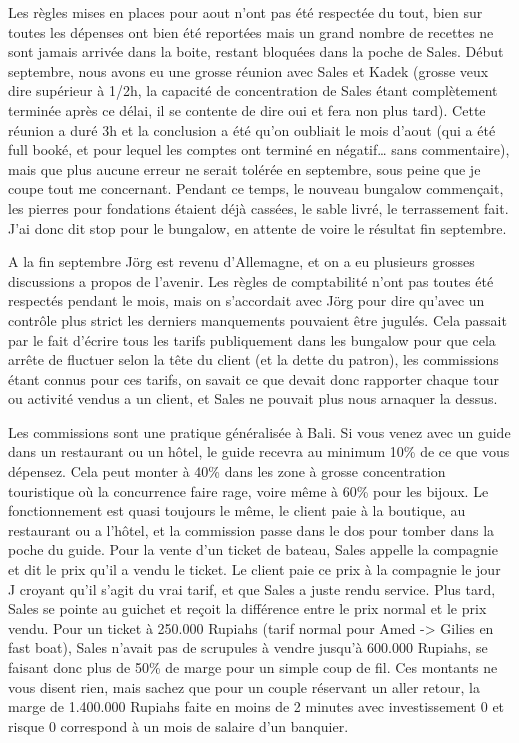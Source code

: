 Les règles mises en places pour aout n’ont pas été respectée du tout, bien sur toutes les dépenses ont bien été reportées mais un grand nombre de recettes ne sont jamais arrivée dans la boite, restant bloquées dans la poche de Sales. Début septembre, nous avons eu une grosse réunion avec Sales et Kadek (grosse veux dire supérieur à 1/2h, la capacité de concentration de Sales étant complètement terminée après ce délai, il se contente de dire oui et fera non plus tard). Cette réunion a duré 3h et la conclusion a été qu’on oubliait le mois d’aout (qui a été full booké, et pour lequel les comptes ont terminé en négatif… sans commentaire), mais que plus aucune erreur ne serait tolérée en septembre, sous peine que je coupe tout me concernant. Pendant ce temps, le nouveau bungalow commençait, les pierres pour fondations étaient déjà cassées, le sable livré, le terrassement fait. J’ai donc dit stop pour le bungalow, en attente de voire le résultat fin septembre.

A la fin septembre Jörg est revenu d’Allemagne, et on a eu plusieurs grosses discussions a propos de l’avenir. Les règles de comptabilité n’ont pas toutes été respectés pendant le mois, mais on s’accordait avec Jörg pour dire qu’avec un contrôle plus strict les derniers manquements pouvaient être jugulés. Cela passait par le fait d’écrire tous les tarifs publiquement dans les bungalow pour que cela arrête de fluctuer selon la tête du client (et la dette du patron), les commissions étant connus pour ces tarifs, on savait ce que devait donc rapporter chaque tour ou activité vendus a un client, et Sales ne pouvait plus nous arnaquer la dessus.

Les commissions sont une pratique généralisée à Bali. Si vous venez avec un guide dans un restaurant ou un hôtel, le guide recevra au minimum 10\% de ce que vous dépensez. Cela peut monter à 40\% dans les zone à grosse concentration touristique où la concurrence faire rage, voire même à 60\% pour les bijoux. Le fonctionnement est quasi toujours le même, le client paie à la boutique, au restaurant ou a l’hôtel, et la commission passe dans le dos pour tomber dans la poche du guide. Pour la vente d’un ticket de bateau, Sales appelle la compagnie et dit le prix qu’il a vendu le ticket. Le client paie ce prix à la compagnie le jour J croyant qu’il s’agit du vrai tarif, et que Sales a juste rendu service. Plus tard, Sales se pointe au guichet et reçoit la différence entre le prix normal et le prix vendu. Pour un ticket à 250.000 Rupiahs (tarif normal pour Amed -> Gilies en fast boat), Sales n’avait pas de scrupules à vendre jusqu’à 600.000 Rupiahs, se faisant donc plus de 50\% de marge pour un simple coup de fil. Ces montants ne vous disent rien, mais sachez que pour un couple réservant un aller retour, la marge de 1.400.000 Rupiahs faite en moins de 2 minutes avec investissement 0 et risque 0 correspond à un mois de salaire d’un banquier.

